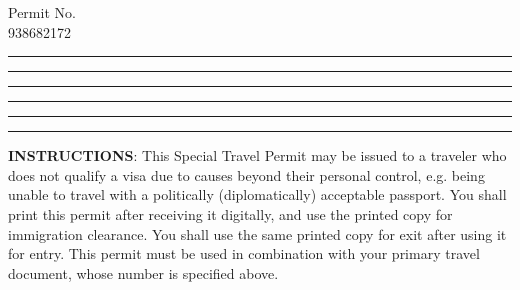 


\formbrickcontentheight=45pt
\formbrickpaddingtop=7pt

\parbox[c]{14em}{
	Permit No.\\
	\ttfamily
	\Large
	938682172
}
\hfill%
\parbox[c]{4em}{
}%



\par\hrule
\formbrickVlineLeft%
\formbrickVlineRight%
\par\hrule
\formbrickVlineLeft%
\formbrickVlineRight%
\par\hrule
\formbrickVlineLeft%
\formbrickVlineMid%
\formbrickVlineMid%
\formbrickVlineRight%
\par\hrule
\formbrickVlineLeft%
\formbrickVlineMid%
\formbrickVlineMid%
\formbrickVlineRight%
\par\hrule
\formbrickVlineLeft%
\formbrickVlineMid%
\formbrickVlineMid%
\formbrickVlineRight%
\par\hrule





\vskip 20pt
\small
\textbf{INSTRUCTIONS}:
\inlinelistitem This Special Travel Permit may be issued to a traveler who does not qualify a visa due to causes beyond their personal control, e.g. being unable to travel with a politically (diplomatically) acceptable passport.
\inlinelistitem You shall print this permit after receiving it digitally, and use the printed copy for immigration clearance.
\inlinelistitem You shall use the same printed copy for exit after using it for entry.
\inlinelistitem This permit must be used in combination with your primary travel document, whose number is specified above.



